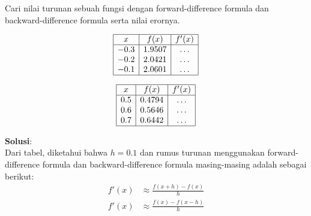 \documentclass[a4paper,12pt]{article}
\newcommand{\jawab}{\textbf{Solusi}:}
\begin{document}
\pagestyle{fancy}

Cari nilai turunan sebuah fungsi dengan forward-difference formula dan backward-difference formula serta nilai erornya.
\vspace*{-0.5cm}
\begin{multicols}{2}
    \[
    \begin{array}{|c|c|c|}
    \hline
    x & f(x) & f'(x) \\
    \hline
    -0.3 & 1.9507 & \dots\\
    -0.2 & 2.0421 & \dots\\
    -0.1 & 2.0601 & \dots\\
    \hline
    \end{array}
    \]

    \[
    \begin{array}{|c|c|c|}
    \hline
    x & f(x) & f'(x) \\
    \hline
    0.5 & 0.4794 & \dots\\
    0.6 & 0.5646 & \dots\\
    0.7 & 0.6442 & \dots\\
    \hline
    \end{array}
    \]
\end{multicols}
\noindent\jawab\\
Dari tabel, diketahui bahwa $h=0.1$ dan rumus turunan menggunakan forward-difference formula dan backward-difference formula masing-masing adalah sebagai berikut:
\begin{align}
    f'(x) &\approx \frac{f(x+h)-f(x)}{h} \label{eq:forward}\\
    f'(x) &\approx \frac{f(x)-f(x-h)}{h} \label{eq:backward}
\end{align}
\end{document}
